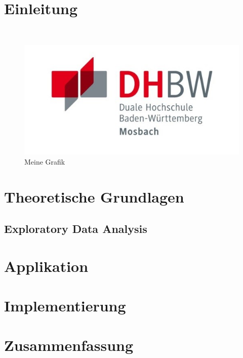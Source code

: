 \chapter{Einleitung} 
    \autocite[vgl.][S.1]{01} \\
    \begin{figure}[h]
        \centering
        \includegraphics{images/dhbw-logo.jpg}
        \caption{Meine Grafik}
        \label{fig:meine-grafik}
    \end{figure}
       

\chapter{Theoretische Grundlagen}

    \section{Exploratory Data Analysis} 


\chapter{Applikation}


\chapter{Implementierung}


\chapter{Zusammenfassung} %
